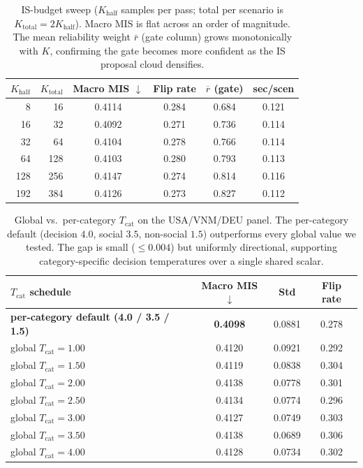 \documentclass{article}
\begin{document}
\begin{table}[H]
\centering\small
\caption{IS-budget sweep ($K_{\text{half}}$ samples per pass; total per scenario is $K_\text{total}{=}2 K_\text{half}$). Macro MIS is flat across an order of magnitude. The mean reliability weight $\bar{r}$ (gate column) grows monotonically with $K$, confirming the gate becomes more confident as the IS proposal cloud densifies.}
\label{tab:r3_k_budget}
\begin{tabular}{rrcccc}\toprule
$K_\text{half}$ & $K_\text{total}$ & Macro MIS $\downarrow$ & Flip rate & $\overline{r}$ (gate) & sec/scen \\\midrule
8 & 16 & 0.4114 & 0.284 & 0.684 & 0.121 \\
16 & 32 & 0.4092 & 0.271 & 0.736 & 0.114 \\
32 & 64 & 0.4104 & 0.278 & 0.766 & 0.114 \\
64 & 128 & 0.4103 & 0.280 & 0.793 & 0.113 \\
128 & 256 & 0.4147 & 0.274 & 0.814 & 0.116 \\
192 & 384 & 0.4126 & 0.273 & 0.827 & 0.112 \\
\bottomrule
\end{tabular}
\end{table}

\begin{table}[H]
\centering\small
\caption{Global vs.\ per-category $T_{\text{cat}}$ on the USA/VNM/DEU panel. The per-category default (decision $4.0$, social $3.5$, non-social $1.5$) outperforms every global value we tested. The gap is small ($\le 0.004$) but uniformly directional, supporting category-specific decision temperatures over a single shared scalar.}
\label{tab:r3_global_tcat}
\begin{tabular}{lccc}\toprule
$T_{\text{cat}}$ schedule & Macro MIS $\downarrow$ & Std & Flip rate \\\midrule
\textbf{per-category default (4.0 / 3.5 / 1.5)} & \textbf{0.4098} & 0.0881 & 0.278 \\\midrule
global $T_\text{cat} = 1.00$ & 0.4120 & 0.0921 & 0.292 \\
global $T_\text{cat} = 1.50$ & 0.4119 & 0.0838 & 0.304 \\
global $T_\text{cat} = 2.00$ & 0.4138 & 0.0778 & 0.301 \\
global $T_\text{cat} = 2.50$ & 0.4134 & 0.0774 & 0.296 \\
global $T_\text{cat} = 3.00$ & 0.4127 & 0.0749 & 0.303 \\
global $T_\text{cat} = 3.50$ & 0.4138 & 0.0689 & 0.306 \\
global $T_\text{cat} = 4.00$ & 0.4128 & 0.0734 & 0.302 \\
\bottomrule
\end{tabular}
\end{table}
\end{document}
